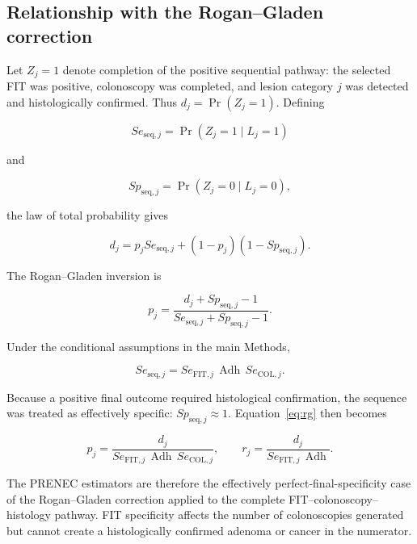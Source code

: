 \documentclass[10pt,a4paper]{article}
\newcommand{\Se}{\mathit{Se}}
\newcommand{\Sp}{\mathit{Sp}}
\newcommand{\Adh}{\operatorname{Adh}}
\begin{document}
\setcounter{figure}{0}
\renewcommand{\thefigure}{S\arabic{figure}}
\setcounter{table}{0}
\renewcommand{\thetable}{S\arabic{table}}

\subsection*{Relationship with the Rogan--Gladen correction}

Let $Z_j=1$ denote completion of the positive sequential pathway: the
selected FIT was positive, colonoscopy was completed, and lesion category
$j$ was detected and histologically confirmed. Thus
$d_j=\Pr(Z_j=1)$. Defining

\begin{equation*}
\Se_{\mathrm{seq},j}=\Pr(Z_j=1\mid L_j=1)
\end{equation*}

and

\begin{equation*}
\Sp_{\mathrm{seq},j}=\Pr(Z_j=0\mid L_j=0),
\end{equation*}

the law of total probability gives

\begin{equation}
d_j=p_j\Se_{\mathrm{seq},j}
+(1-p_j)(1-\Sp_{\mathrm{seq},j}).
\label{eq:total}
\end{equation}

The Rogan--Gladen inversion is

\begin{equation}
p_j=
\frac{d_j+\Sp_{\mathrm{seq},j}-1}
{\Se_{\mathrm{seq},j}+\Sp_{\mathrm{seq},j}-1}.
\label{eq:rg}
\end{equation}

Under the conditional assumptions in the main Methods,

\begin{equation*}
\Se_{\mathrm{seq},j}
=\Se_{\mathrm{FIT},j}\,\Adh\,\Se_{\mathrm{COL},j}.
\end{equation*}

Because a positive final outcome required histological confirmation, the
sequence was treated as effectively specific:
$\Sp_{\mathrm{seq},j}\approx1$. Equation~\eqref{eq:rg} then becomes

\begin{equation*}
p_j=
\frac{d_j}
{\Se_{\mathrm{FIT},j}\,\Adh\,\Se_{\mathrm{COL},j}},
\qquad
r_j=
\frac{d_j}{\Se_{\mathrm{FIT},j}\,\Adh}.
\end{equation*}

The PRENEC estimators are therefore the effectively perfect-final-specificity
case of the Rogan--Gladen correction applied to the complete
FIT--colonoscopy--histology pathway. FIT specificity affects the number of
colonoscopies generated but cannot create a histologically confirmed adenoma
or cancer in the numerator.
\end{document}
